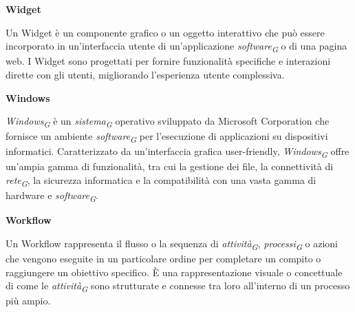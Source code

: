 \documentclass{article}
\begin{document}
\vspace{0.4cm}

\textbf{Widget}

\vspace{0.1cm}

Un Widget è un componente grafico o un oggetto interattivo che può essere incorporato in un'interfaccia utente di un'applicazione \textit{software}\textsubscript{\textit{G}} o di una pagina web. I Widget sono progettati per fornire funzionalità specifiche e interazioni dirette con gli utenti, migliorando l'esperienza utente complessiva.

\vspace{0.4cm}

\textbf{Windows}

\vspace{0.1cm}

\textit{Windows}\textsubscript{\textit{G}} è un \textit{sistema}\textsubscript{\textit{G}} operativo sviluppato da Microsoft Corporation che fornisce un ambiente \textit{software}\textsubscript{\textit{G}} per l'esecuzione di applicazioni su dispositivi informatici. Caratterizzato da un'interfaccia grafica user-friendly, \textit{Windows}\textsubscript{\textit{G}} offre un'ampia gamma di funzionalità, tra cui la gestione dei file, la connettività di \textit{rete}\textsubscript{\textit{G}}, la sicurezza informatica e la compatibilità con una vasta gamma di hardware e \textit{software}\textsubscript{\textit{G}}.

\vspace{0.4cm}

\textbf{Workflow}

\vspace{0.1cm}

Un Workflow rappresenta il flusso o la sequenza di \textit{attività}\textsubscript{\textit{G}}, \textit{processi}\textsubscript{\textit{G}} o azioni che vengono eseguite in un particolare ordine per completare un compito o raggiungere un obiettivo specifico. È una rappresentazione visuale o concettuale di come le \textit{attività}\textsubscript{\textit{G}} sono strutturate e connesse tra loro all'interno di un processo più ampio.
\end{document}
